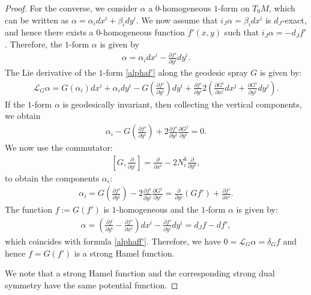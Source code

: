 \documentclass[10pt,a4paper]{amsart}
\begin{document}
\begin{proof}
For the converse, we consider $\alpha$ a $0$-homogeneous $1$-form on $T_0M$, which can be written as
$ \alpha=\alpha_i dx^i+\beta_i dy^i$. We now assume that $i_J\alpha = \beta_i dx^i$ is $d_J$-exact, and hence there exists a $0$-homogeneous function $f'(x,y)$ such that $i_J\alpha=-d_Jf'$.
Therefore, the $1$-form $\alpha$ is given by
\begin{eqnarray} \label{alphaf'}
\alpha=\alpha_i dx^i - \frac{\partial f'}{\partial y^i}dy^i.
\end{eqnarray}
 The Lie derivative of the $1$-form \eqref{alphaf'} along the geodesic spray $G$ is given by:
\begin{eqnarray*}
\mathcal{L}_G\alpha = G(\alpha_i)dx^i + \alpha_i dy^i - G\left(\frac{\partial f'}{\partial y^i}\right) dy^i + \frac{\partial f'}{\partial y^i} 2\left(\frac{\partial G^i}{\partial x^j}dx^j + \frac{\partial G^i}{\partial y^j} dy^j\right).  
\end{eqnarray*}
If the $1$-form $\alpha$ is geodesically invariant, then collecting the vertical components, we obtain 
\begin{eqnarray*}
\alpha_i - G\left(\frac{\partial f'}{\partial y^i}\right) + 2 \frac{\partial f'}{\partial y^j} \frac{\partial G^j}{\partial y^i}=0. 
\end{eqnarray*}
We now use the commutator: 
\begin{eqnarray*}
\left[G, \frac{\partial}{\partial y^i}\right] = \frac{\partial}{\partial x^i} - 2N^k_i\frac{\partial}{\partial y^k},
\end{eqnarray*}
to obtain the components $\alpha_i$:
\begin{eqnarray*}
\alpha_i = G\left(\frac{\partial f'}{\partial y^i}\right) - 2 \frac{\partial f'}{\partial y^j} \frac{\partial G^j}{\partial y^i} = \frac{\partial}{\partial y^i}\left(Gf'\right) + \frac{\partial f'}{\partial x^i}.
\end{eqnarray*}
The function $f:=G(f')$ is $1$-homogeneous and the $1$-form $\alpha$ is given by:
\begin{eqnarray*}
\alpha=\left(\frac{\partial f}{\partial y^i} -  \frac{\partial f'}{\partial x^i}\right) dx^i - \frac{\partial f'}{\partial y^i}dy^i = d_Jf-df',
\end{eqnarray*} 
 which coincides with formula \eqref{alphaff'}. Therefore, we have $0=\mathcal{L}_G\alpha=\delta_Gf$ and hence $f=G(f')$ is a strong Hamel function. 
 
We note that a strong Hamel function and the corresponding strong dual symmetry have the same potential function. 


\end{proof}
\end{document}
